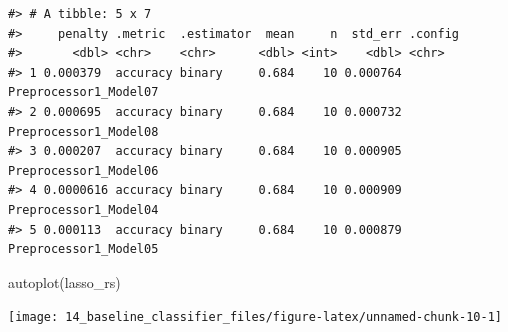 \documentclass[
]{krantz}
\makeatletter
\newenvironment{Shaded}{\begin{snugshade}}{\end{snugshade}}
\newcommand{\FunctionTok}[1]{\textcolor[rgb]{0.00,0.00,0.00}{#1}}
\newcommand{\NormalTok}[1]{#1}
\newenvironment{kframe}{%
\medskip{}
\setlength{\fboxsep}{.8em}
 \def\at@end@of@kframe{}%
 \ifinner\ifhmode%
  \def\at@end@of@kframe{\end{minipage}}%
  \begin{minipage}{\columnwidth}%
 \fi\fi%
 \def\FrameCommand##1{\hskip\@totalleftmargin \hskip-\fboxsep
 \colorbox{shadecolor}{##1}\hskip-\fboxsep
     \hskip-\linewidth \hskip-\@totalleftmargin \hskip\columnwidth}%
 \MakeFramed {\advance\hsize-\width
   \@totalleftmargin\z@ \linewidth\hsize
   \@setminipage}}%
 {\par\unskip\endMakeFramed%
 \at@end@of@kframe}
\renewenvironment{Shaded}{\begin{kframe}}{\end{kframe}}
\makeatother
\begin{document}
\begin{verbatim}
#> # A tibble: 5 x 7
#>     penalty .metric  .estimator  mean     n  std_err .config              
#>       <dbl> <chr>    <chr>      <dbl> <int>    <dbl> <chr>                
#> 1 0.000379  accuracy binary     0.684    10 0.000764 Preprocessor1_Model07
#> 2 0.000695  accuracy binary     0.684    10 0.000732 Preprocessor1_Model08
#> 3 0.000207  accuracy binary     0.684    10 0.000905 Preprocessor1_Model06
#> 4 0.0000616 accuracy binary     0.684    10 0.000909 Preprocessor1_Model04
#> 5 0.000113  accuracy binary     0.684    10 0.000879 Preprocessor1_Model05
\end{verbatim}

\begin{Shaded}
\begin{Highlighting}[]
\FunctionTok{autoplot}\NormalTok{(lasso\_rs)}
\end{Highlighting}
\end{Shaded}

\begin{center}\texttt{[image: 14\_baseline\_classifier\_files/figure-latex/unnamed-chunk-10-1]} \end{center}

  

\backmatter
\printindex
\end{document}
